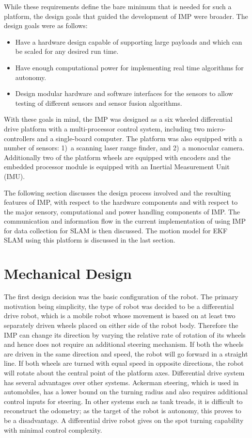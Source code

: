 While these requirements define the bare minimum that is needed for such a platform, the design goals that guided the development of IMP were broader. The design goals were as follows:

\begin{itemize}
	\item Have a hardware design capable of supporting large payloads and which can be scaled for any desired run time.
	\item Have enough computational power for implementing real time algorithms for autonomy.
	\item Design modular hardware and software interfaces for the sensors to allow testing of different sensors and sensor fusion algorithms.
\end{itemize}

With these goals in mind, the IMP was designed as a six wheeled differential drive platform with a multi-processor control system, including two micro-controllers and a single-board computer. The platform was also equipped with a number of sensors: 1)~a scanning laser range finder, and 2)~a monocular camera. Additionally two of the platform wheels are equipped with encoders and the embedded processor module is equipped with an Inertial Measurement Unit (IMU). 

The following section discusses the design process involved and the resulting features of IMP, with respect to the hardware components and with respect to the major sensory, computational and power handling components of IMP. The communication and information flow in the current implementation of using IMP for data collection for SLAM is then discussed. The motion model for EKF SLAM using this platform is discussed in the last section. 

\section{Mechanical Design}

The first design decision was the basic configuration of the robot. The primary motivation being simplicity, the type of robot was decided to be a differential drive robot, which is a mobile robot whose movement is based on at least two separately driven wheels placed on either side of the robot body. Therefore the IMP can change its direction by varying the relative rate of rotation of its wheels and hence does not require an additional steering mechanism. If both the wheels are driven in the same direction and speed, the robot will go forward in a straight line. If both wheels are turned with equal speed in opposite directions, the robot will rotate about the central point of the platform axes. Differential drive system  has several advantages over other systems. Ackerman steering, which is used in automobiles, has a lower bound on the turning radius and also requires additional control inputs for steering. In other systems such as tank treads, it is difficult to reconstruct the odometry; as the target of the robot is autonomy, this proves to be a disadvantage. A differential drive robot gives on the spot turning capability with minimal control complexity.

